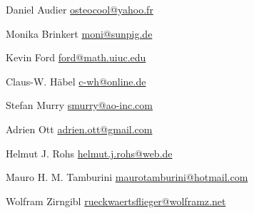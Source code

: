 \item Daniel Audier \url{osteocool@yahoo.fr}
\item Monika Brinkert \url{moni@sunpig.de}
\item Kevin Ford \url{ford@math.uiuc.edu}
\item Claus-W. Häbel \url{c-wh@online.de}
\item Stefan Murry \url{smurry@ao-inc.com}
\item Adrien Ott \url{adrien.ott@gmail.com}
\item Helmut J. Rohs \url{helmut.j.rohs@web.de}
\item Mauro H. M. Tamburini \url{maurotamburini@hotmail.com}
\item Wolfram Zirngibl \url{rueckwaertsflieger@wolframz.net}

